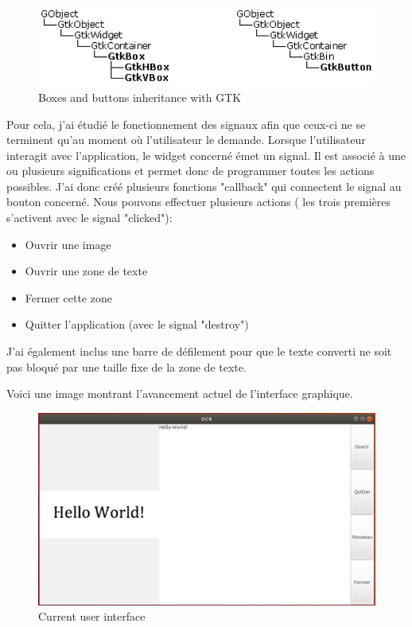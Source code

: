 \documentclass[12pt]{report}
\begin{document}
\begin{figure}[H]
    \centering
    \includegraphics[width=1\textwidth]{GTK2}
    \caption{Boxes and buttons inheritance with GTK}
\end{figure}

Pour cela, j’ai étudié le fonctionnement des signaux afin que ceux-ci ne se terminent qu’au moment où l’utilisateur le demande. Lorsque l’utilisateur interagit avec l’application, le widget concerné émet un signal. Il est associé à une ou plusieurs significations et permet donc de programmer toutes les actions possibles. J’ai donc créé plusieurs fonctions "callback" qui connectent le signal au bouton concerné. 
Nous pouvons effectuer plusieurs actions ( les trois premières s’activent avec le signal "clicked"):

\begin{itemize}[label=\textbullet]
	\item Ouvrir une image
	\item Ouvrir une zone de texte
	\item Fermer cette zone
	\item Quitter l'application (avec le signal "destroy")
\end{itemize}

J’ai également inclus une barre de défilement pour que le texte converti ne soit pas bloqué par une taille fixe de la zone de texte.

\newpage
Voici une image montrant l’avancement actuel de l’interface graphique.

\begin{figure}[H]
    \centering
    \includegraphics[width=1\textwidth]{UI}
    \caption{Current user interface}
\end{figure}
\end{document}

